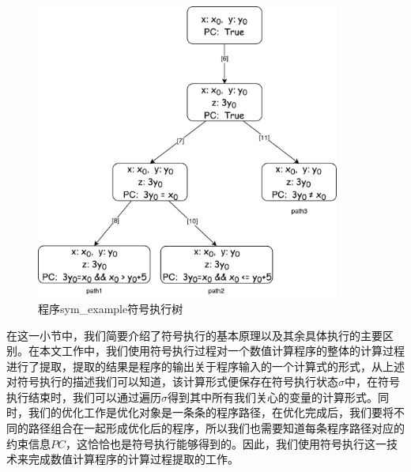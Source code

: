 \begin{figure}[hbp]
    \centering
    \includegraphics[width=100mm]{fig/SymExecTree.pdf}
    \caption{程序sym\_example符号执行树} \label{fig:symexectree}
 \end{figure}


在这一小节中，我们简要介绍了符号执行的基本原理以及其余具体执行的主要区别。在本文工作中，我们使用符号执行过程对一个数值计算程序的整体的计算过程进行了提取，提取的结果是程序的输出关于程序输入的一个计算式的形式，从上述对符号执行的描述我们可以知道，该计算形式便保存在符号执行状态$\sigma$中，在符号执行结束时，我们可以通过遍历$\sigma$得到其中所有我们关心的变量的计算形式。同时，我们的优化工作是优化对象是一条条的程序路径，在优化完成后，我们要将不同的路径组合在一起形成优化后的程序，所以我们也需要知道每条程序路径对应的约束信息$PC$，这恰恰也是符号执行能够得到的。因此，我们使用符号执行这一技术来完成数值计算程序的计算过程提取的工作。